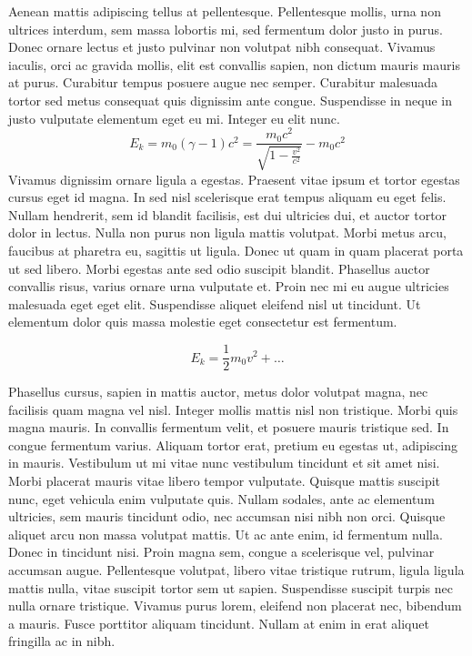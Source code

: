 Aenean mattis adipiscing tellus at pellentesque.
Pellentesque mollis, urna non ultrices interdum, sem massa lobortis mi, sed fermentum dolor justo in purus.
Donec ornare lectus et justo pulvinar non volutpat nibh consequat.
Vivamus iaculis, orci ac gravida mollis, elit est convallis sapien, non dictum mauris mauris at purus.
Curabitur tempus posuere augue nec semper.
Curabitur malesuada tortor sed metus consequat quis dignissim ante congue.
Suspendisse in neque in justo vulputate elementum eget eu mi.
Integer eu elit nunc.
\[
  E_k = m_0 (\gamma - 1) c^2  = \frac{m_0 c^2}{\sqrt{1 - \frac{v^2}{c^2}}} - m_0 c^2
\]
Vivamus dignissim ornare ligula a egestas.
Praesent vitae ipsum et tortor egestas cursus eget id magna.
In sed nisl scelerisque erat tempus aliquam eu eget felis.
Nullam hendrerit, sem id blandit facilisis, est dui ultricies dui, et auctor tortor dolor in lectus.
Nulla non purus non ligula mattis volutpat.
Morbi metus arcu, faucibus at pharetra eu, sagittis ut ligula.
Donec ut quam in quam placerat porta ut sed libero.
Morbi egestas ante sed odio suscipit blandit.
Phasellus auctor convallis risus, varius ornare urna vulputate et.
Proin nec mi eu augue ultricies malesuada eget eget elit.
Suspendisse aliquet eleifend nisl ut tincidunt.
Ut elementum dolor quis massa molestie eget consectetur est fermentum.

\begin{equation}
  E_k = \frac{1}{2} m_0 v^2 + \dots
\end{equation}

Phasellus cursus, sapien in mattis auctor, metus dolor volutpat magna, nec facilisis quam magna vel nisl.
Integer mollis mattis nisl non tristique.
Morbi quis magna mauris.
In convallis fermentum velit, et posuere mauris tristique sed.
In congue fermentum varius.
Aliquam tortor erat, pretium eu egestas ut, adipiscing in mauris.
Vestibulum ut mi vitae nunc vestibulum tincidunt et sit amet nisi.
Morbi placerat mauris vitae libero tempor vulputate.
Quisque mattis suscipit nunc, eget vehicula enim vulputate quis.
Nullam sodales, ante ac elementum ultricies, sem mauris tincidunt odio, nec accumsan nisi nibh non orci.
Quisque aliquet arcu non massa volutpat mattis.
Ut ac ante enim, id fermentum nulla.
Donec in tincidunt nisi.
Proin magna sem, congue a scelerisque vel, pulvinar accumsan augue.
Pellentesque volutpat, libero vitae tristique rutrum, ligula ligula mattis nulla, vitae suscipit tortor sem ut sapien.
Suspendisse suscipit turpis nec nulla ornare tristique.
Vivamus purus lorem, eleifend non placerat nec, bibendum a mauris.
Fusce porttitor aliquam tincidunt.
Nullam at enim in erat aliquet fringilla ac in nibh.

